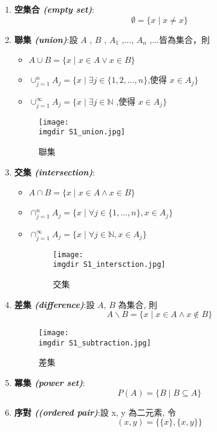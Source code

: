 \begin{enumerate}
		 \item {\textbf{空集合   \emph{ (empty set)}}:
		 $$ \emptyset = \{x \mid x \neq x\}$$
		 }
		 \item {\textbf{聯集   \emph{ (union)}}:設 $A$ , $B$ , $A_1$ ,..., $A_n$ ,...皆為集合，則
		 \begin{itemize}
		 	\item $A \cup B = \{x \mid x \in A \vee x \in B \}$
		 	\item $ \cup_{j=1}^{n} A_j = \{ x \mid \exists j \in \{ 1,2,...,n \}$,使得 $x \in A_j \}$
		 	\item $\cup_{j=1}^{\infty} A_j = \{ x \mid \exists j \in \mathbb{N} $ ,使得 $x \in A_j \}$
		 \end{itemize}
		 }
		 \begin{figure}[H]	
		 	 \centering	 			 	 
   			 \texttt{[image: \\imgdir S1\_union.jpg]} 
   			 \caption{聯集}   		
   			 \label{set:union}   			 		 
		 \end{figure}
		 \item {\textbf{交集   \emph{ (intersection)}}:
		 \begin{itemize}
		 	\item $ A \cap B = \{ x \mid x \in A \wedge x \in B \}$
		 	\item $ \cap_{j=1}^{n} A_j = \{ x \mid \forall j \in \{ 1,...,n \} , x \in A_j \}$
		 	\item $ \cap_{j=1}^{\infty} A_j = \{ x \mid \forall j \in \mathbb{N} , x \in A_j \}$
		 	\begin{figure}[H]
		 		\centering	 
   			 	\texttt{[image: \\imgdir S1\_intersction.jpg]} 
   			 	\caption{交集}   		
   			 	\label{set:intercstion}
   			 \end{figure}
		 \end{itemize}
		 }
		 \item {\textbf{差集   \emph{ (difference)}}:設 $A$, $B$ 為集合, 則	
		 $$ A \backslash B = \{ x \mid x \in A \wedge x \notin B \}$$
		 \begin{figure}[H]	
		 	 \centering	 			 	 
   			 \texttt{[image: \\imgdir S1\_subtraction.jpg]} 
   			 \caption{差集}   		
   			 \label{set:subtraction}   			 		 
		 \end{figure}
		 }
		 \item {\textbf{冪集   \emph{ (power set)}}:
		 $$ P(A)=\{ B \mid B \subseteq A \} $$
		 }
		 \item {\textbf{序對   \emph{ ((ordered pair)}}:設 x, y 為二元素, 令
		 $$ (x,y) = \{\{ x \},\{ x,y\}\} $$
}
\end{enumerate}

